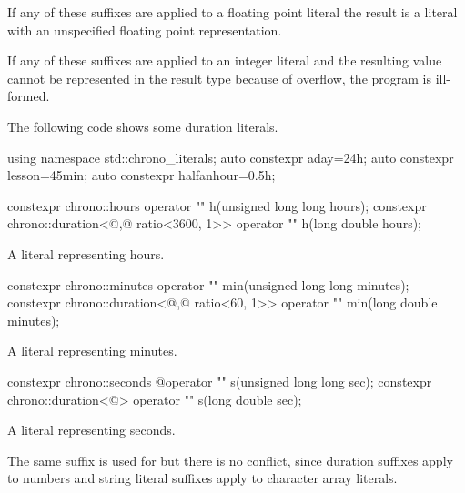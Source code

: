 \pnum
If any of these suffixes are applied to a floating point literal the result is a
 literal with an unspecified floating point representation.

\pnum
If any of these suffixes are applied to an integer literal and the resulting
 value cannot be represented in the result type because
of overflow, the program is ill-formed.

\pnum
\enterexample
The following code shows some duration literals.
\begin{codeblock}
using namespace std::chrono_literals;
auto constexpr aday=24h;
auto constexpr lesson=45min;
auto constexpr halfanhour=0.5h;
\end{codeblock}
\exitexample

\begin{itemdecl}
constexpr chrono::hours                                 operator "" h(unsigned long long hours);
constexpr chrono::duration<@\unspec,@ ratio<3600, 1>> operator "" h(long double hours);
\end{itemdecl}

\begin{itemdescr}
\pnum
\returns
A  literal representing  hours.
\end{itemdescr}

\begin{itemdecl}
constexpr chrono::minutes                             operator "" min(unsigned long long minutes);
constexpr chrono::duration<@\unspec,@ ratio<60, 1>> operator "" min(long double minutes);
\end{itemdecl}

\begin{itemdescr}
\pnum
\returns
A  literal representing  minutes.
\end{itemdescr}

\begin{itemdecl}
constexpr chrono::seconds  @\itcorr@             operator "" s(unsigned long long sec);
constexpr chrono::duration<@\unspec@> operator "" s(long double sec);
\end{itemdecl}

\begin{itemdescr}
\pnum
\returns
A  literal representing  seconds.

\pnum
\enternote
The same suffix  is used for  but there is no
conflict, since duration suffixes apply to numbers and string literal suffixes
apply to character array literals.
\exitnote
\end{itemdescr}


